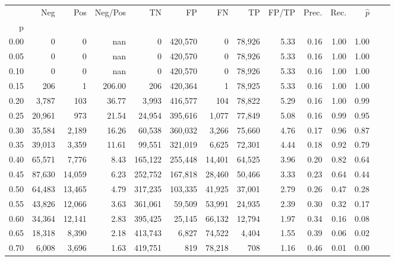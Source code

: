 \begin{tabular}{rrrrrrrrrrrrrr}
\toprule
{} &     Neg &     Pos & Neg/Pos &       TN &       FP &      FN &      TP & FP/TP & Prec. &  Rec. & $\hat{p}$ \\
p    &         &         &         &          &          &         &         &       &       &       &           \\
\midrule
0.00 &       0 &       0 &     nan &        0 &  420,570 &       0 &  78,926 &  5.33 &  0.16 &  1.00 &      1.00 \\
0.05 &       0 &       0 &     nan &        0 &  420,570 &       0 &  78,926 &  5.33 &  0.16 &  1.00 &      1.00 \\
0.10 &       0 &       0 &     nan &        0 &  420,570 &       0 &  78,926 &  5.33 &  0.16 &  1.00 &      1.00 \\
0.15 &     206 &       1 &  206.00 &      206 &  420,364 &       1 &  78,925 &  5.33 &  0.16 &  1.00 &      1.00 \\
0.20 &   3,787 &     103 &   36.77 &    3,993 &  416,577 &     104 &  78,822 &  5.29 &  0.16 &  1.00 &      0.99 \\
0.25 &  20,961 &     973 &   21.54 &   24,954 &  395,616 &   1,077 &  77,849 &  5.08 &  0.16 &  0.99 &      0.95 \\
0.30 &  35,584 &   2,189 &   16.26 &   60,538 &  360,032 &   3,266 &  75,660 &  4.76 &  0.17 &  0.96 &      0.87 \\
0.35 &  39,013 &   3,359 &   11.61 &   99,551 &  321,019 &   6,625 &  72,301 &  4.44 &  0.18 &  0.92 &      0.79 \\
0.40 &  65,571 &   7,776 &    8.43 &  165,122 &  255,448 &  14,401 &  64,525 &  3.96 &  0.20 &  0.82 &      0.64 \\
0.45 &  87,630 &  14,059 &    6.23 &  252,752 &  167,818 &  28,460 &  50,466 &  3.33 &  0.23 &  0.64 &      0.44 \\
0.50 &  64,483 &  13,465 &    4.79 &  317,235 &  103,335 &  41,925 &  37,001 &  2.79 &  0.26 &  0.47 &      0.28 \\
0.55 &  43,826 &  12,066 &    3.63 &  361,061 &   59,509 &  53,991 &  24,935 &  2.39 &  0.30 &  0.32 &      0.17 \\
0.60 &  34,364 &  12,141 &    2.83 &  395,425 &   25,145 &  66,132 &  12,794 &  1.97 &  0.34 &  0.16 &      0.08 \\
0.65 &  18,318 &   8,390 &    2.18 &  413,743 &    6,827 &  74,522 &   4,404 &  1.55 &  0.39 &  0.06 &      0.02 \\
0.70 &   6,008 &   3,696 &    1.63 &  419,751 &      819 &  78,218 &     708 &  1.16 &  0.46 &  0.01 &      0.00 \\

\end{tabular}
